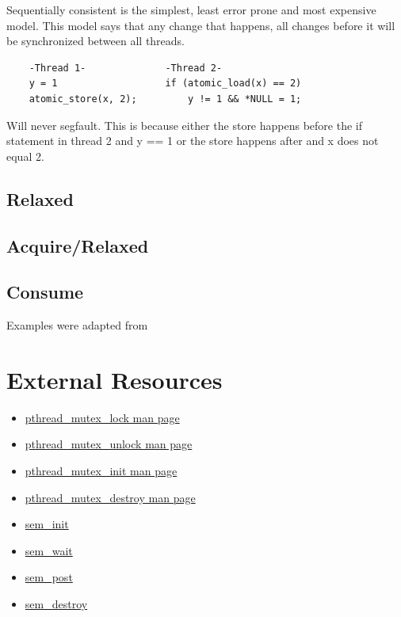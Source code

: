 Sequentially consistent is the simplest, least error prone and most expensive model. This model says that any change that happens, all changes before it will be synchronized between all threads.

\begin{verbatim}
    -Thread 1-              -Thread 2-
    y = 1                   if (atomic_load(x) == 2)
    atomic_store(x, 2);         y != 1 && *NULL = 1;
\end{verbatim}

Will never segfault. This is because either the store happens before the if statement in thread 2 and y == 1 or the store happens after and x does not equal 2.

\subsection{Relaxed}


\subsection{Acquire/Relaxed}


\subsection{Consume}


Examples were adapted from

\section{External Resources}

\begin{itemize}
\item \href{http://linux.die.net/man/3/pthread_mutex_lock}{pthread\_mutex\_lock man page} 
\item \href{http://linux.die.net/man/3/pthread_mutex_unlock}{pthread\_mutex\_unlock man page} 
\item \href{http://linux.die.net/man/3/pthread_mutex_init}{pthread\_mutex\_init man page} 
\item \href{http://linux.die.net/man/3/pthread_mutex_destroy}{pthread\_mutex\_destroy man page}
\item \href{http://man7.org/linux/man-pages/man3/sem_init.3.html}{sem\_init} 
\item \href{http://man7.org/linux/man-pages/man3/sem_wait.3.html}{sem\_wait} 
\item \href{http://man7.org/linux/man-pages/man3/sem_post.3.html}{sem\_post} 
\item \href{http://man7.org/linux/man-pages/man3/sem_destroy.3.html}{sem\_destroy}
\end{itemize}



